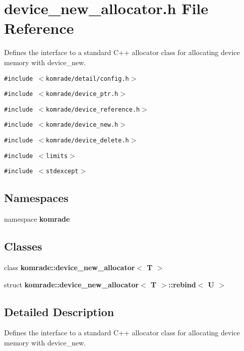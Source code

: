 \section{device\_\-new\_\-allocator.h File Reference}
\label{device__new__allocator_8h}
Defines the interface to a standard C++ allocator class for allocating device memory with device\_\-new. 

{\tt \#include $<$komrade/detail/config.h$>$}\par
{\tt \#include $<$komrade/device\_\-ptr.h$>$}\par
{\tt \#include $<$komrade/device\_\-reference.h$>$}\par
{\tt \#include $<$komrade/device\_\-new.h$>$}\par
{\tt \#include $<$komrade/device\_\-delete.h$>$}\par
{\tt \#include $<$limits$>$}\par
{\tt \#include $<$stdexcept$>$}\par
\subsection*{Namespaces}
\begin{CompactItemize}
\item 
namespace {\bf komrade}
\end{CompactItemize}
\subsection*{Classes}
\begin{CompactItemize}
\item 
class {\bf komrade::device\_\-new\_\-allocator$<$ T $>$}
\item 
struct \textbf{komrade::device\_\-new\_\-allocator$<$ T $>$::rebind$<$ U $>$}
\end{CompactItemize}


\subsection{Detailed Description}
Defines the interface to a standard C++ allocator class for allocating device memory with device\_\-new. 

